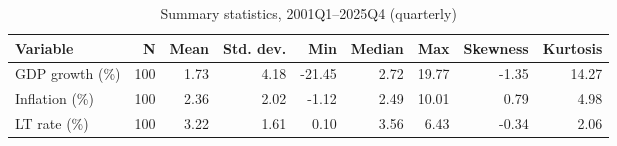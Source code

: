 \begin{table}

\caption{\label{tab:summary-stats}Summary statistics, 2001Q1--2025Q4 (quarterly)}
\centering
\begin{tabular}[t]{lrrrrrrrr}
\toprule
Variable & N & Mean & Std. dev. & Min & Median & Max & Skewness & Kurtosis\\
\midrule
GDP growth (\%) & 100 & 1.73 & 4.18 & -21.45 & 2.72 & 19.77 & -1.35 & 14.27\\
Inflation (\%) & 100 & 2.36 & 2.02 & -1.12 & 2.49 & 10.01 & 0.79 & 4.98\\
LT rate (\%) & 100 & 3.22 & 1.61 & 0.10 & 3.56 & 6.43 & -0.34 & 2.06\\
\bottomrule
\end{tabular}
\end{table}
